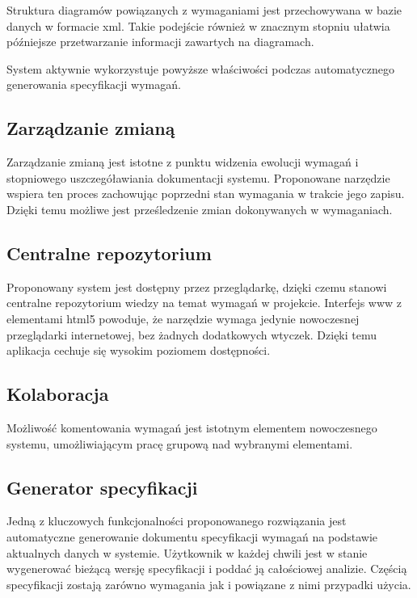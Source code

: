       Struktura diagramów powiązanych z wymaganiami jest przechowywana w bazie danych w formacie xml. Takie podejście również w znacznym stopniu ułatwia późniejsze przetwarzanie informacji zawartych na diagramach. 
      
      System aktywnie wykorzystuje powyższe właściwości podczas automatycznego generowania specyfikacji wymagań.

    \subsection{Zarządzanie zmianą}
      Zarządzanie zmianą jest istotne z punktu widzenia ewolucji wymagań i stopniowego uszczegóławiania dokumentacji systemu. Proponowane narzędzie wspiera ten proces zachowując poprzedni stan wymagania w trakcie jego zapisu. Dzięki temu możliwe jest prześledzenie zmian dokonywanych w wymaganiach. 

    \subsection{Centralne repozytorium}
      Proponowany system jest dostępny przez przeglądarkę, dzięki czemu stanowi centralne repozytorium wiedzy na temat wymagań w projekcie. Interfejs www z elementami html5 powoduje, że narzędzie wymaga jedynie nowoczesnej przeglądarki internetowej, bez żadnych dodatkowych wtyczek. Dzięki temu aplikacja cechuje się wysokim poziomem dostępności.  

    \subsection{Kolaboracja}
      Możliwość komentowania wymagań jest istotnym elementem nowoczesnego systemu, umożliwiającym pracę grupową nad wybranymi elementami.

    \subsection{Generator specyfikacji}
      Jedną z kluczowych funkcjonalności proponowanego rozwiązania jest automatyczne generowanie dokumentu specyfikacji wymagań na podstawie aktualnych danych w systemie.
      Użytkownik w każdej chwili jest w stanie wygenerować bieżącą wersję specyfikacji i poddać ją całościowej analizie. Częścią specyfikacji zostają zarówno wymagania jak i powiązane z nimi przypadki użycia.

